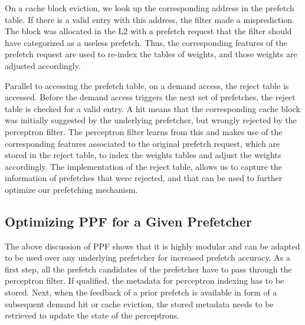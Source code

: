 On a cache block eviction, we look up the corresponding address in the
prefetch table. If there is a valid entry with this address, the
filter made a misprediction. The block was allocated in the L2 with a
prefetch request that the filter should have categorized as a useless
prefetch. Thus, the corresponding features of the prefetch request are
used to re-index the tables of weights, and those weights are adjusted
accordingly.

Parallel to accessing the prefetch table, on a demand access, the
reject table is accessed. Before the demand access triggers the next
set of prefetches, the reject table is checked for a valid entry. A
hit means that the corresponding cache block was initially suggested
by the {underlying} prefetcher, but wrongly rejected by the perceptron
filter. The perceptron filter learns from this and makes use of the
corresponding features associated to the original prefetch request,
which are stored in the reject table, to index the weights tables and
adjust the weights accordingly.
The implementation of the reject table, allows us to capture the 
information of prefetches that were rejected, and that can be used 
to further optimize our prefetching mechanism.

\subsection{Optimizing PPF for a Given Prefetcher}
\label{Arch-Generalizing}
The above discussion of PPF shows that it is highly modular and can be
adapted to be used over any {underlying} prefetcher for increased prefetch
accuracy. As a first step, all the prefetch
candidates of the prefetcher have to pass through the perceptron filter. 
If qualified, the metadata for perceptron indexing has to be stored. 
Next, when the feedback of a prior prefetch is available in form
of a subsequent demand hit or cache eviction, the stored
metadata needs to be retrieved to update the state of the perceptrons.

